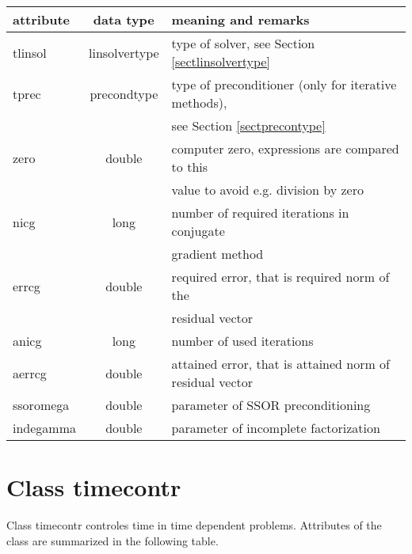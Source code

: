 \begin{center}
\begin{tabular}{|l|c|l|}
\hline
attribute & data type & meaning and remarks
\\ \hline \hline
{\sf tlinsol} & {\sf linsolvertype} & type of solver, see Section \ref{sectlinsolvertype}
\\ \hline
{\sf tprec} & {\sf precondtype} & type of preconditioner (only for iterative methods),
\\
 & & see Section \ref{sectprecontype}
\\ \hline
{\sf zero} & {\sf double} &  computer zero, expressions are compared to this
\\
 & & value to avoid e.g. division by zero
\\ \hline
{\sf nicg} & {\sf long} & number of required iterations in conjugate
\\
 & & gradient method
\\ \hline
{\sf errcg} & {\sf double} & required error, that is required norm of the
\\
 & & residual vector
\\ \hline
{\sf anicg} & {\sf long} & number of used iterations
\\ \hline
{\sf aerrcg} & {\sf double} & attained error, that is attained norm of residual vector
\\ \hline
{\sf ssoromega} & {\sf double} & parameter of SSOR preconditioning
\\ \hline
{\sf indegamma} & {\sf double} & parameter of incomplete factorization
\\ \hline
\end{tabular}
\end{center}

\section{Class {\sf timecontr}}
Class {\sf timecontr} controles time in time dependent problems. Attributes of the class are summarized
in the following table.

